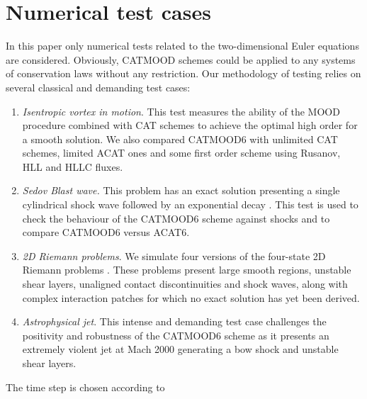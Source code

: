 %
\section{Numerical test cases}  \label{sec:numerics}
In this paper only numerical tests related to the two-dimensional Euler equations are considered. Obviously, CATMOOD schemes could be applied to any systems of conservation laws without any restriction.
Our methodology of testing relies on several classical and demanding test cases: 
\begin{enumerate}
    \item \textit{Isentropic vortex in motion}. This test measures the ability of the MOOD procedure combined with CAT schemes to achieve the optimal high order for a smooth solution. We also compared CATMOOD6 with unlimited CAT schemes, limited ACAT ones and some first order scheme using Rusanov, HLL and HLLC fluxes.
    \item \textit{Sedov Blast wave.} This problem has an exact solution presenting a single cylindrical shock wave followed by an exponential decay \cite{Sedov}. This test is used to check the behaviour of the CATMOOD6 scheme against shocks and to compare CATMOOD6 versus ACAT6.
    \item \textit{2D Riemann problems}. We simulate four versions of the four-state 2D Riemann problems \cite{RP_Schultz93}. These problems present large smooth regions, unstable shear layers, unaligned contact discontinuities and shock waves, along with complex interaction patches for which no exact solution has yet been derived.
    \item \textit{Astrophysical jet}. This intense and demanding test case challenges the positivity and robustness of the CATMOOD6 scheme as it presents an extremely violent jet at Mach 2000 generating a bow shock and unstable shear layers. 
\end{enumerate}

The time step is chosen according to 
